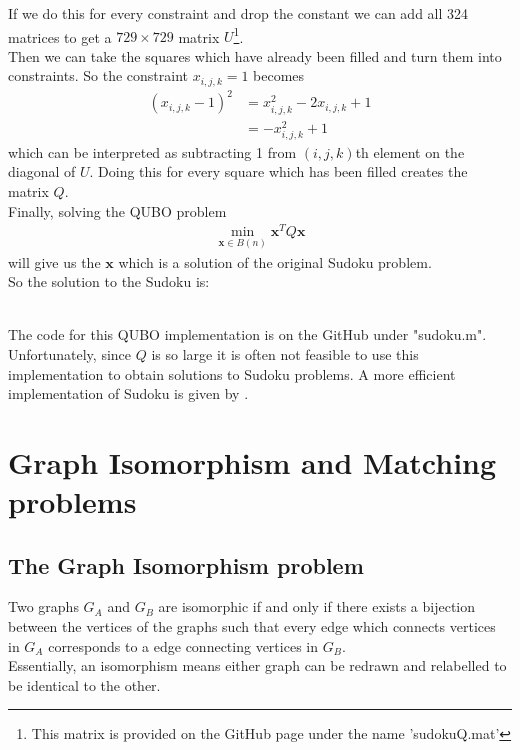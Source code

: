 \documentclass{article}
\begin{document}
\noindent If we do this for every constraint and drop the constant we can add all 324 matrices to get a \(729 \times 729\) matrix \(U\)\footnote{This matrix is provided on the GitHub page under the name 'sudokuQ.mat' }.\\

\noindent Then we can take the squares which have already been filled and turn them into constraints. So the constraint \(x_{i,j,k} = 1\) becomes 
\begin{align*}
    (x_{i,j,k} - 1)^2 &= x_{i,j,k}^2 - 2x_{i,j,k} + 1 \\
    &= -x_{i,j,k}^2 + 1
\end{align*}
which can be interpreted as subtracting 1 from \((i,j,k)\)th element on the diagonal of \(U\). Doing this for every square which has been filled creates the matrix \(Q\).\\

\noindent Finally, solving the QUBO problem
\begin{align*}
    \min_{\mathbf{x} \in B(n)} \mathbf{x}^T Q \mathbf{x}
\end{align*}
will give us the \(\mathbf{x}\) which is a solution of the original Sudoku problem.\\

\noindent So the solution to the Sudoku is:

\hspace{92pt}\begin{lpsudoku}[scale=0.5]
\end{lpsudoku}\\

\noindent The code for this QUBO implementation is on the GitHub under "sudoku.m".\\
 
\noindent Unfortunately, since \(Q\) is so large it is often not feasible to use this implementation to obtain solutions to Sudoku problems. A more efficient implementation of Sudoku is given by \cite{mücke2024sudoku}.

\section{Graph Isomorphism and Matching problems}
\subsection{The Graph Isomorphism problem}
Two graphs \(G_A\) and \(G_B\) are isomorphic if and only if there exists a bijection between the vertices of the graphs such that every edge which connects vertices in \(G_A\) corresponds to a edge connecting vertices in \(G_B\). \\
Essentially, an isomorphism means either graph can be redrawn and relabelled to be identical to the other. \\
\end{document}
